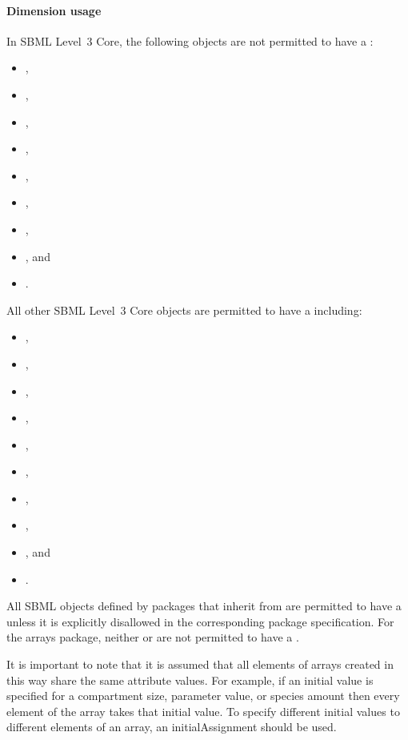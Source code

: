 \paragraph{Dimension usage}
\label{sec:dimensionUsage}

In SBML Level~3 Core, the following objects are not permitted to have a \ListOfDimensions:
\begin{itemize}
\item {},  
\item {},  
\item {},  
\item {},  
\item {},  
\item {},  
\item {},  
\item {}, and 
\item {}.
\end{itemize}
All other SBML Level~3 Core objects are permitted to have a \ListOfDimensions including:
\begin{itemize}
\item {},
\item {},
\item {},
\item {},
\item {},
\item {},
\item {},
\item {},
\item {}, and
\item {}.    
\end{itemize}
All SBML objects defined by packages that inherit from \SBase are permitted to have a \ListOfDimensions unless it is explicitly disallowed in the corresponding package specification.   For the arrays package, neither \Dimension or \Index are not permitted to have a \ListOfDimensions.

It is important to note that it is assumed that all elements of arrays created in this way share the same attribute values.   For example, if an initial value is specified for a compartment size, parameter value, or species amount then every element of the array takes that initial value.   To specify different initial values to different elements of an array, an initialAssignment should be used.  

